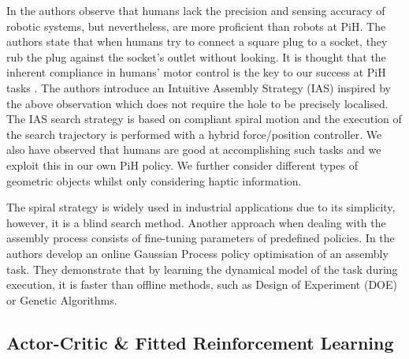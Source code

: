 In \cite{intuitive_peg_isr_2013} the authors observe that humans lack the precision and sensing 
accuracy of robotic systems, but nevertheless, are more proficient than robots at PiH. The authors state that when 
humans try to connect a square plug to a socket, they rub the plug against the socket's 
outlet without looking. It is thought that the inherent compliance in humans' motor control  
is the key to our success at PiH tasks \cite{compliant_manip_icra_2008}. 
The authors introduce an Intuitive Assembly Strategy (IAS) inspired by the above observation which 
does not require the hole to be precisely localised. The IAS search strategy is based on compliant 
spiral motion and the execution of the search trajectory is performed with a hybrid force/position controller.
We also have observed that humans are good at accomplishing such tasks and we exploit this in our own PiH policy. 
We further consider different types of geometric objects whilst only considering haptic information.

The spiral strategy is widely used in industrial applications due to its simplicity, 
however, it is a blind search method. Another approach when dealing with the assembly
process consists of fine-tuning parameters of predefined policies. In \cite{online_gpr_icra_2014}
the authors develop an online Gaussian Process policy optimisation of an assembly task. They 
demonstrate that by learning the dynamical model of the task during execution, it is faster than offline methods, 
such as Design of Experiment (DOE) or Genetic Algorithms.


\subsection{Actor-Critic \& Fitted Reinforcement Learning}

